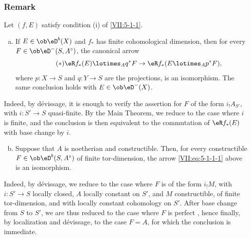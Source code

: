 \documentclass[oneside]{book}
\begin{document}
\subsubsection{Remark}\label{VII:5-1-2}

Let $(f,E)$ satisfy condition (i) of \ref{VII:5-1-1}.
\begin{enumerate}[a)]
  \item If $E\in \ob \eD^b(X)$ and $f_\ast$ has finite cohomological
    dimension, then for every $F\in \ob\eD^-(S,A^\circ)$, the canonical arrow
    \begin{equation*}\tag{$*$}\label{VII:eq:5-1-1-1}
      \eR f_\ast(E)\lotimes_A q^\ast F \to \eR f_\ast(E\lotimes_A p^\ast F) \text{,} 
    \end{equation*}
    where $p:X\to S$ and $q:Y\to S$ are the projections, is an isomorphism.
    The same conclusion holds with $E\in\ob\eD^-(X)$.
\end{enumerate} 

Indeed, by dévissage, it is enough to verify the assertion for $F$ of the
form $i_! A_{S'}$, with $i:S'\to S$ quasi-finite. By the Main Theorem, we
reduce to the case where $i$ is finite, and the conclusion is then equivalent
to the commutation of $\eR f_\ast(E)$ with base change by $i$.
\begin{enumerate}[a)]
\setcounter{enumi}{1}
  \item Suppose that $A$ is noetherian and constructible. Then, for every
    constructible $F\in\ob\eD^b(S,A^\circ)$ of finite tor-dimension, the arrow
    \eqref{VII:eq:5-1-1-1} above is an isomorphism.
\end{enumerate}

Indeed, by dévissage, we reduce to the case where $F$ is of the form $i_! M$,
with $i:S'\to S$ locally closed, $A$ locally constant on $S'$, and $M$
constructible, of finite tor-dimension, and with locally constant cohomology
on $S'$. After base change from $S$ to $S'$, we are thus reduced to the case
where $F$ is perfect \cite[I]{sga6}, hence finally, by localization and
dévissage, to the case $F=A$, for which the conclusion is immediate.





\subsubsection{}\label{VII:5-1-3}
\end{document}
